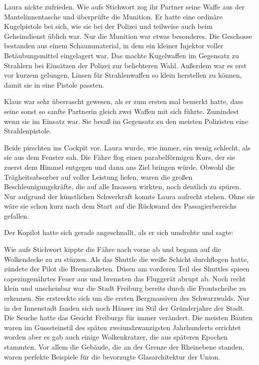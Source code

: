 \par

Laura nickte zufrieden. Wie aufs Stichwort zog ihr Partner seine Waffe aus der Mantelinnentasche und überprüfte die Munition. Er hatte eine ordinäre Kugelpistole bei sich, wie sie bei der Polizei und teilweise auch beim Geheimdienst üblich war. Nur die Munition war etwas besonderes. Die Geschosse bestanden aus einem Schaummaterial, in dem ein kleiner Injektor voller Betäubungsmittel eingelagert war. Das machte Kugelwaffen im Gegensatz zu Strahlern bei Einsätzen der Polizei zur beliebteren Wahl. Außerdem war es erst vor kurzem gelungen, Linsen für Strahlenwaffen so klein herstellen zu können, damit sie in eine Pistole passten.

\par

Klaus war sehr überrascht gewesen, als er zum ersten mal bemerkt hatte, dass seine sonst so sanfte Partnerin gleich zwei Waffen mit sich führte. Zumindest wenn sie im Einsatz war. Sie besaß im Gegensatz zu den meisten Polizisten eine Strahlenpistole.

\par

Beide pirschten ins Cockpit vor. Laura wurde, wie immer, ein wenig schlecht, als sie aus dem Fenster sah. Die Fähre flog einen parabelförmigen Kurs, der sie zuerst dem Himmel entgegen und dann ans Ziel bringen würde. Obwohl die Trägheitsabsorber auf voller Leistung liefen, waren die großen Beschleunigungskräfte, die auf alle Insassen wirkten, noch deutlich zu spüren. Nur aufgrund der künstlichen Schwerkraft konnte Laura aufrecht stehen. Ohne sie wäre sie schon kurz nach dem Start auf die Rückwand des Passagierbereichs gefallen.

\par

Der Kopilot hatte sich gerade angeschnallt, als er sich umdrehte und sagte: 

\par

Wie aufs Stichwort kippte die Fähre nach vorne ab und begann auf die Wolkendecke zu zu stürzen. Als das Shuttle die weiße Schicht durchflogen hatte, zündete der Pilot die Bremsraketen. Düsen am vorderen Teil des Shuttles spieen capezingenährtes Feuer aus und bremsten das Fluggerät abrupt ab. Noch recht klein und unscheinbar war die Stadt Freiburg bereits durch die Frontscheibe zu erkennen. Sie erstreckte sich um die ersten Bergmassiven des Schwarzwalds. Nur in der Innenstadt fanden sich noch Häuser im Stil der Gründerjahre der Stadt. Die Seuche hatte das Gesicht Freiburgs für immer verändert. Die meisten Bauten waren im Gusssteinstil des späten zweiundzwanzigsten Jahrhunderts errichtet worden aber es gab auch einige Wolkenkratzer, die aus späteren Epochen stammten. Vor allem die Gebäude, die an der Grenze der Rheinebene standen, waren perfekte Beispiele für die bevorzugte Glasarchitektur der Union.

